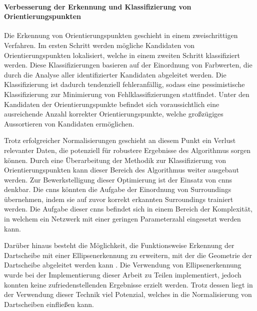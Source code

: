 \paragraph{Verbesserung der Erkennung und Klassifizierung von Orientierungspunkten}

Die Erkennung von Orientierungspunkten geschieht in einem zweischrittigen Verfahren. Im ersten Schritt werden mögliche Kandidaten von Orientierungspunkten lokalisiert, welche in einem zweiten Schritt klassifiziert werden. Diese Klassifizierungen basieren auf der Einordnung von Farbwerten, die durch die Analyse aller identifizierter Kandidaten abgeleitet werden. Die Klassifizierung ist dadurch tendenziell fehleranfällig, sodass eine pessimistische Klassifizierung zur Minimierung von Fehlklassifizierungen stattfindet. Unter den Kandidaten der Orientierungspunkte befindet sich voraussichtlich eine ausreichende Anzahl korrekter Orientierungspunkte, welche großzügiges Aussortieren von Kandidaten ermöglichen.

Trotz erfolgreicher Normalisierungen geschieht an diesem Punkt ein Verlust relevanter Daten, die potenziell für robustere Ergebnisse des Algorithmus sorgen können. Durch eine Überarbeitung der Methodik zur Klassifizierung von Orientierungspunkten kann dieser Bereich des Algorithmus weiter ausgebaut werden. Zur Bewerkstelligung dieser Optimierung ist der Einsatz von \acp{cnn} denkbar. Die \acp{cnn} könnten die Aufgabe der Einordnung von Surroundings übernehmen, indem sie auf zuvor korrekt erkannten Surroundings trainiert werden. Die Aufgabe dieser \acp{cnn} befindet sich in einem Bereich der Komplexität, in welchem ein Netzwerk mit einer geringen Parameterzahl eingesetzt werden kann.


Darüber hinaus besteht die Möglichkeit, die Funktionsweise Erkennung der Dartscheibe mit einer Ellipsenerkennung zu erweitern, mit der die Geometrie der Dartscheibe abgeleitet werden kann \cite{ellipse_detection_algorithm}. Die Verwendung von Ellipsenerkennung wurde bei der Implementierung dieser Arbeit zu Teilen implementiert, jedoch konnten keine zufriedenstellenden Ergebnisse erzielt werden. Trotz dessen liegt in der Verwendung dieser Technik viel Potenzial, welches in die Normalisierung von Dartscheiben einfließen kann.

